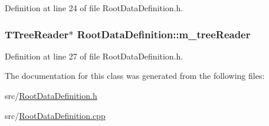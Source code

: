 Definition at line 24 of file Root\+Data\+Definition.\+h.

\hypertarget{classRootDataDefinition_a919827bdd245e61c0f54676d59cc7448}{
\subsubsection[{m\+\_\+tree\+Reader}]{\setlength{\rightskip}{0pt plus 5cm}T\+Tree\+Reader$\ast$ Root\+Data\+Definition\+::m\+\_\+tree\+Reader\hspace{0.3cm}{\ttfamily [protected]}}}\label{classRootDataDefinition_a919827bdd245e61c0f54676d59cc7448}


Definition at line 27 of file Root\+Data\+Definition.\+h.



The documentation for this class was generated from the following files\+:\begin{DoxyCompactItemize}
\item 
src/\hyperlink{RootDataDefinition_8h}{Root\+Data\+Definition.\+h}\item 
src/\hyperlink{RootDataDefinition_8cpp}{Root\+Data\+Definition.\+cpp}\end{DoxyCompactItemize}
